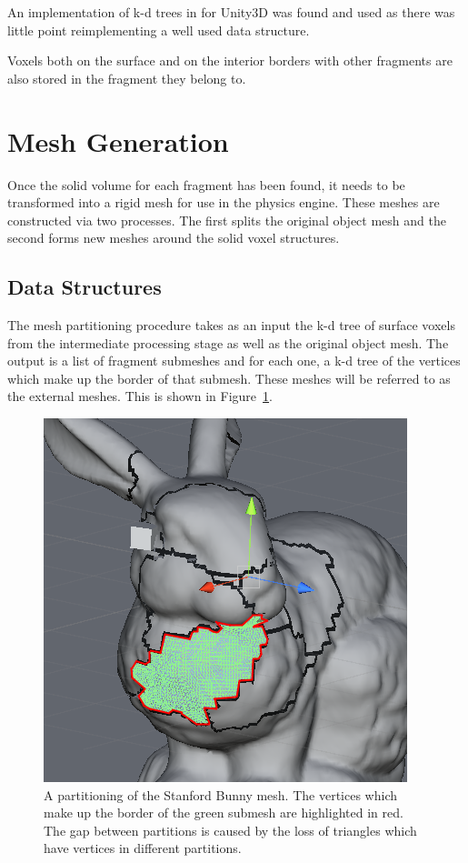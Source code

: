 An implementation of k-d trees in {} for Unity3D was found and used as there was little point reimplementing a well used data structure\cite{kdtree}.

Voxels both on the surface and on the interior borders with other fragments are also stored in the fragment they belong to.

\section{Mesh Generation}

Once the solid volume for each fragment has been found, it needs to be transformed into a rigid mesh for use in the physics engine. These meshes are constructed via two processes. The first splits the original object mesh and the second forms new meshes around the solid voxel structures.

\subsection{Data Structures}

The mesh partitioning procedure takes as an input the k-d tree of surface voxels from the intermediate processing stage as well as the original object mesh. The output is a list of fragment submeshes and for each one, a k-d tree of the vertices which make up the border of that submesh. These meshes will be referred to as the external meshes. This is shown in Figure~\ref{fig:3.8}.

\begin{figure}[b!]
\centerline{\includegraphics[scale=0.35]{mesh_border.png}}
\caption{A partitioning of the Stanford Bunny mesh. The vertices which make up the border of the green submesh are highlighted in red. The gap between partitions is caused by the loss of triangles which have vertices in different partitions.}
\label{fig:3.8}
\end{figure}

